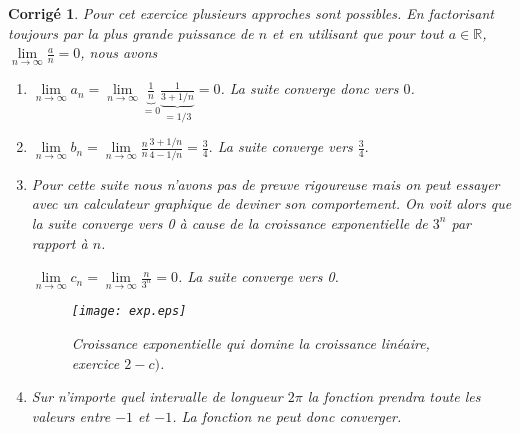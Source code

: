 \documentclass[11pt,french,table]{article}
\theoremstyle{exercice}
\theoremstyle{corrigé}
\newtheorem{corrigé}{Corrigé}
\begin{document}
\begin{corrigé}
      Pour cet exercice plusieurs approches sont possibles. En factorisant toujours par la plus grande puissance de $n$ et en utilisant que pour tout $a\in \mathbb{R}$, $\lim\limits_{n\to \infty}{\frac{a}{n}}=0$, nous avons 
    \begin{enumerate}
   
        \item[(a)] $\lim\limits_{n\to \infty}{a_n}=\lim\limits_{n\to \infty}{\underbrace{\frac{1}{n}}_{=0}\underbrace{\frac{1}{3+1/n}}_{=1/3}}=0$. La suite converge donc vers $0$.
        \item[(b)] $\lim\limits_{n\to \infty}{b_n}=\lim\limits_{n\to \infty}{\frac{n}{n}\frac{3+1/n}{4-1/n}}=\frac{3}{4}.$ La suite converge vers $\frac{3}{4}.$
        
         \item[(c)] Pour cette suite nous n'avons pas de preuve rigoureuse mais on peut essayer avec un calculateur graphique de deviner son comportement. On voit alors que la suite converge vers 0 à cause de la croissance exponentielle de $3^n$ par rapport à $n$.
    
    $\lim\limits_{n\to \infty}{c_n}=\lim\limits_{n\to \infty}{\frac{n}{3^n}}=0$. La suite converge vers 0.  
    \begin{figure}[h!]
        \centering
        \texttt{[image: exp.eps]}
        \caption{Croissance exponentielle qui domine la croissance linéaire, exercice $2-c)$.}
        \label{fig:my_label}
    \end{figure}
    \item[(d)] Sur n'importe quel intervalle de longueur $2\pi $ la fonction prendra toute les valeurs entre $-1$ et $-1$. La fonction ne peut donc converger. 
    \end{enumerate}
\end{corrigé}
\vspace{1em}
\end{document}
